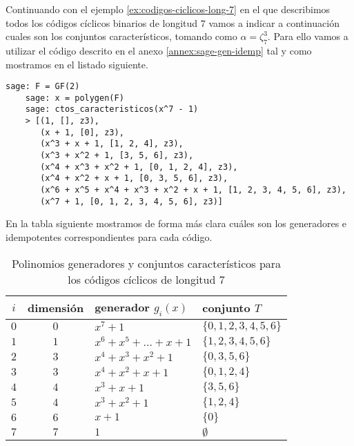 \begin{example}
  Continuando con el ejemplo \ref{ex:codigos-ciclicos-long-7} en el que describimos todos los códigos cíclicos binarios de longitud \(7\) vamos a indicar a continuación cuales son los conjuntos característicos, tomando como \(\alpha = \zeta_7^3\).
  Para ello vamos a utilizar el código descrito en el anexo \ref{annex:sage-gen-idemp} tal y como mostramos en el listado siguiente.
  \begin{lstlisting}[gobble=4]
    sage: F = GF(2)
    sage: x = polygen(F)
    sage: ctos_caracteristicos(x^7 - 1)
    > [(1, [], z3),
       (x + 1, [0], z3),
       (x^3 + x + 1, [1, 2, 4], z3),
       (x^3 + x^2 + 1, [3, 5, 6], z3),
       (x^4 + x^3 + x^2 + 1, [0, 1, 2, 4], z3),
       (x^4 + x^2 + x + 1, [0, 3, 5, 6], z3),
       (x^6 + x^5 + x^4 + x^3 + x^2 + x + 1, [1, 2, 3, 4, 5, 6], z3),
       (x^7 + 1, [0, 1, 2, 3, 4, 5, 6], z3)]
  \end{lstlisting}
  En la tabla siguiente mostramos de forma más clara cuáles son los generadores e idempotentes correspondientes para cada código.
  \begin{table}[h]
    \centering
    \sffamily
    \begin{tabular}{ccll}
      \toprule
      \(i\) & dimensión & generador \(g_i(x)\) & conjunto \(T\)\\
      \midrule
      \(0\) & \(0\) & \(x^7 + 1\) & \(\{0, 1, 2, 3, 4, 5, 6\}\)\\
      \(1\) & \(1\) & \(x^6 + x^5 + \dots + x + 1\) & \(\{1, 2, 3, 4, 5, 6\}\)\\
      \(2\) & \(3\) & \(x^4 + x^3 + x^2 + 1\) & \(\{0, 3, 5, 6\}\)\\
      \(3\) & \(3\) & \(x^4 + x^2 + x + 1\) & \(\{0, 1, 2, 4\}\)\\
      \(4\) & \(4\) & \(x^3 + x + 1\) & \(\{3, 5, 6\}\)\\
      \(5\) & \(4\) & \(x^3 + x^2 + 1\) & \(\{1, 2, 4\}\)\\
      \(6\) & \(6\) & \(x + 1\) & \(\{0\}\)\\
      \(7\) & \(7\) & \(1\) & \(\emptyset\)\\
      \bottomrule
    \end{tabular}
    \caption{Polinomios generadores y conjuntos característicos para los códigos cíclicos de longitud 7}
  \end{table}
\end{example}

